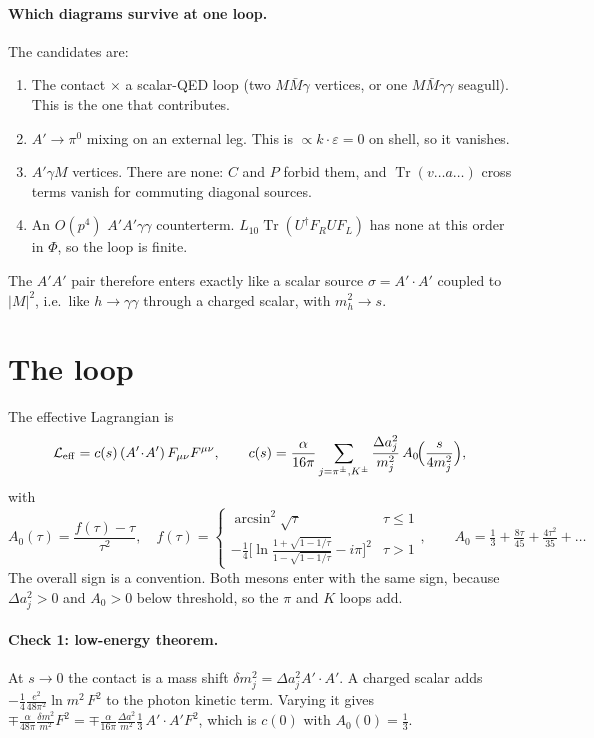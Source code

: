 \documentclass{article}
\newcommand{\tr}{\operatorname{Tr}}
\newcommand{\Da}{\Delta a}
\begin{document}
\paragraph{Which diagrams survive at one loop.} The candidates are:
\begin{enumerate}
\item The contact $\times$ a scalar-QED loop (two $M\bar M\gamma$ vertices, or one
  $M\bar M\gamma\gamma$ seagull). This is the one that contributes.
\item $A'\to\pi^0$ mixing on an external leg. This is $\propto k\cdot\varepsilon=0$ on shell, so it
  vanishes.
\item $A'\gamma M$ vertices. There are none: $C$ and $P$ forbid them, and $\tr(v\ldots a\ldots)$
  cross terms vanish for commuting diagonal sources.
\item An $O(p^4)$ $A'A'\gamma\gamma$ counterterm. $L_{10}\tr(U^\dagger F_R UF_L)$ has none at this
  order in $\Phi$, so the loop is finite.
\end{enumerate}
The $A'A'$ pair therefore enters exactly like a scalar source $\sigma=A'\!\cdot\!A'$ coupled to
$|M|^2$, i.e.\ like $h\to\gamma\gamma$ through a charged scalar, with $m_h^2\to s$.

\section{The loop}

The effective Lagrangian is
\begin{equation}
\mathcal L_{\rm eff}=c(s)\,(A'\!\cdot\!A')\,F_{\mu\nu}F^{\mu\nu},\qquad
c(s)=\frac{\alpha}{16\pi}\sum_{j=\pi^\pm,K^\pm}\frac{\Da_j^2}{m_j^2}\,A_0\!\Big(\frac{s}{4m_j^2}\Big),
\end{equation}
with
\begin{equation}
A_0(\tau)=\frac{f(\tau)-\tau}{\tau^2},\quad
f(\tau)=\begin{cases}\arcsin^2\sqrt\tau & \tau\le1\\[2pt]
-\tfrac14\Big[\ln\frac{1+\sqrt{1-1/\tau}}{1-\sqrt{1-1/\tau}}-i\pi\Big]^2 & \tau>1\end{cases},
\qquad A_0=\tfrac13+\tfrac{8\tau}{45}+\tfrac{4\tau^2}{35}+\dots
\end{equation}
The overall sign is a convention. Both mesons enter with the same sign, because $\Da_j^2>0$ and
$A_0>0$ below threshold, so the $\pi$ and $K$ loops add.

\paragraph{Check 1: low-energy theorem.} At $s\to0$ the contact is a mass shift
$\delta m_j^2=\Da_j^2A'\!\cdot\!A'$. A charged scalar adds
$-\tfrac14\tfrac{e^2}{48\pi^2}\ln m^2\,F^2$ to the photon kinetic term. Varying it gives
$\mp\tfrac{\alpha}{48\pi}\tfrac{\delta m^2}{m^2}F^2=\mp\tfrac{\alpha}{16\pi}\tfrac{\Da^2}{m^2}\tfrac13\,A'\!\cdot\!A'F^2$,
which is $c(0)$ with $A_0(0)=\tfrac13$.
\end{document}
